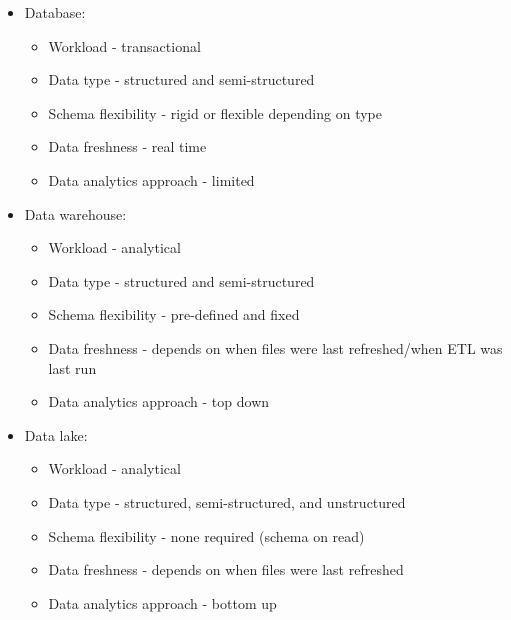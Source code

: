 \documentclass[8pt,landscape,a4paper, fleqn, dvipsnames]{extarticle}
\begin{document}
\begin{multicols*}{4}
\begin{itemize}
\begin{itemize}
        \item Database:
        \begin{itemize}
            \item Workload - transactional
            \item Data type - structured and semi-structured
            \item Schema flexibility - rigid or flexible depending on type
            \item Data freshness - real time
            \item Data analytics approach - limited
        \end{itemize}
        \item Data warehouse:
        \begin{itemize}
            \item Workload - analytical
            \item Data type - structured and semi-structured
            \item Schema flexibility - pre-defined and fixed
            \item Data freshness - depends on when files were last refreshed/when ETL was last run
            \item Data analytics approach - top down 
        \end{itemize}
        \item Data lake:
        \begin{itemize}
            \item Workload - analytical
            \item Data type - structured, semi-structured, and unstructured
            \item Schema flexibility - none required (schema on read)
            \item Data freshness - depends on when files were last refreshed
            \item Data analytics approach - bottom up 
        \end{itemize}
    \end{itemize}
    \end{itemize}


\end{multicols*}
\end{document}
